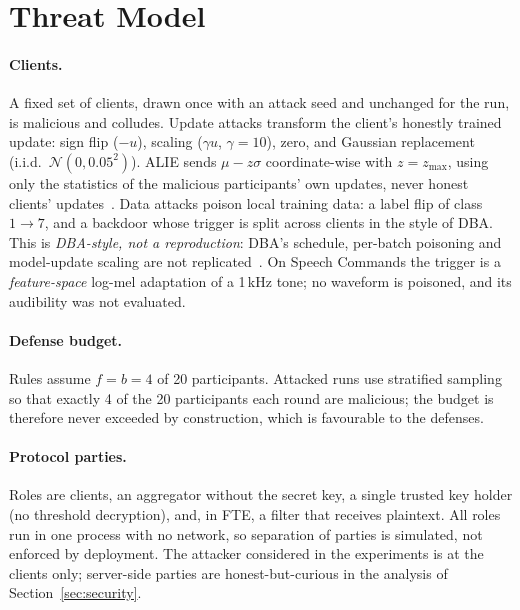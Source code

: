 \section{Threat Model}
\label{sec:threat}

\paragraph{Clients.}
A fixed set of clients, drawn once with an attack seed and unchanged for the run, is malicious and colludes. Update attacks transform the client's honestly trained update: sign flip ($-u$), scaling ($\gamma u$, $\gamma=10$), zero, and Gaussian replacement (i.i.d.\ $\mathcal{N}(0,0.05^2)$). ALIE sends $\mu-z\sigma$ coordinate-wise with $z=z_{\max}$, using only the statistics of the malicious participants' own updates, never honest clients' updates~\cite{baruch2019alie}. Data attacks poison local training data: a label flip of class $1\to 7$, and a backdoor whose trigger is split across clients in the style of DBA. This is \emph{DBA-style, not a reproduction}: DBA's schedule, per-batch poisoning and model-update scaling are not replicated~\cite{xie2020dba}. On Speech Commands the trigger is a \emph{feature-space} log-mel adaptation of a 1\,kHz tone; no waveform is poisoned, and its audibility was not evaluated.

\paragraph{Defense budget.}
Rules assume $f=b=4$ of 20 participants. Attacked runs use stratified sampling so that exactly 4 of the 20 participants each round are malicious; the budget is therefore never exceeded by construction, which is favourable to the defenses.

\paragraph{Protocol parties.}
Roles are clients, an aggregator without the secret key, a single trusted key holder (no threshold decryption), and, in FTE, a filter that receives plaintext. All roles run in one process with no network, so separation of parties is simulated, not enforced by deployment. The attacker considered in the experiments is at the clients only; server-side parties are honest-but-curious in the analysis of Section~\ref{sec:security}.
